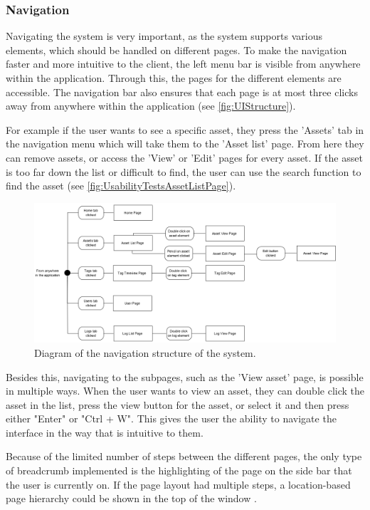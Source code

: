 \subsubsection*{Navigation}
Navigating the system is very important, as the system supports various elements, which should be handled on different pages. To make the navigation faster and more intuitive to the client, the left menu bar is visible from anywhere within the application. Through this, the pages for the different elements are accessible. The navigation bar also ensures that each page is at most three clicks away from anywhere within the application (see \autoref{fig:UIStructure}).
\par
For example if the user wants to see a specific asset, they press the 'Assets' tab in the navigation menu which will take them to the 'Asset list' page. From here they can remove assets, or access the 'View' or 'Edit' pages for every asset. If the asset is too far down the list or difficult to find, the user can use the search function to find the asset (see \autoref{fig:UsabilityTestsAssetListPage}).

\begin{figure}[H]
    \centering
    \includegraphics[width=1\textwidth]{figures/UIDesignElements/UI_Design_Structure.png}
    \caption{Diagram of the navigation structure of the system.}
    \label{fig:UIStructure}
\end{figure}

Besides this, navigating to the subpages, such as the 'View asset' page, is possible in multiple ways. When the user wants to view an asset, they can double click the asset in the list, press the view button for the asset, or select it and then press either "Enter" or "Ctrl + W". This gives the user the ability to navigate the interface in the way that is intuitive to them.
\par
Because of the limited number of steps between the different pages, the only type of breadcrumb implemented is the highlighting of the page on the side bar that the user is currently on. If the page layout had multiple steps, a location-based page hierarchy could be shown in the top of the window \citep{Breadcrumbs}.

